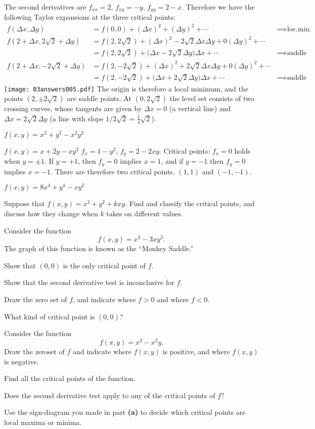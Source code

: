 \begin{multicols}{2}
The second derivatives are $f_{xx} = 2$, $f_{xy} = -y$, $f_{yy} =
2-x$.  Therefore we have the following Taylor expansions at the
three critical points:
\begin{align*}
    f(\Delta x, \Delta y) 
    &= f(0,0) + (\Delta x)^2 + (\Delta y)^2 + \cdots
    &\implies \text{loc.min.}\\
    f(2+\Delta x, 2\sqrt{2} + \Delta y) 
    &= f(2, 2\sqrt{2}) + (\Delta x)^2 - 2\sqrt{2} \Delta x \Delta y +
    0(\Delta y)^2+\cdots\\
    &= f(2, 2\sqrt{2}) + \bigl(\Delta x - 2\sqrt{2} \Delta y\bigr)
    \Delta x +\cdots
    &\implies \text{saddle}\\
    f(2+\Delta x, -2\sqrt{2} + \Delta y) 
    &= f(2, -2\sqrt{2}) + (\Delta x)^2 + 2\sqrt{2} \Delta x \Delta y +
    0(\Delta y)^2+\cdots\\
    &= f(2, -2\sqrt{2}) + \bigl(\Delta x + 2\sqrt{2} \Delta y\bigr)
    \Delta x +\cdots
    &\implies \text{saddle}
\end{align*}
\texttt{[image: 03answers005.pdf]}
The origin is therefore a local minimum, and the points $(2,
\pm2\sqrt{2})$ are saddle points.  At $(0, 2\sqrt{2})$ the level set
consists of two crossing curves, whose tangents are given by
$\Delta x=0$ (a vertical line) and $\Delta x=2\sqrt{2}\Delta y$ (a line
with slope $1/2\sqrt{2} = \frac14\sqrt{2}$).
\endanswer

\subprob $f(x, y) = x^2 + y^2 - x^2y^2$ 

\subprob $f(x,y) = x+2y - xy^2$ 
\answer 
$f_x = 1-y^2$, $f_y = 2-2xy$.  
Critical points: $f_x=0$ holds when $y=\pm 1$.  If $y=+1$, then
$f_y=0$ implies $x=1$, and if $y=-1$ then $f_y=0$ implies $x=-1$.
There are therefore two critical points, $(1,1)$ and $(-1,-1)$.
\endanswer

\subprob $f(x, y) = 8x^4 + y^4 - xy^2$ 

\problem Suppose that $f(x,y)=x^2+y^2+kxy$. Find and classify the critical  
points, and discuss how they change when $k$ takes on different values.

\problem Consider the function
\[
f(x,y)=x^3-3xy^2.
\]
The graph of this function is known as the ``Monkey Saddle.''

\subprob Show that $(0,0)$ is the only critical point of $f$. 

\subprob Show that the second derivative test is inconclusive for $f$. 

\subprob Draw the zero set of $f$, and indicate where $f>0$ and where $f<0$. 

\subprob What kind of critical point is $(0,0)$? 

\problem Consider the function
\[
f(x,y)=x^3 - x^2y.
\]
\subprob Draw the zeroset of $f$ and indicate where $f(x,y)$ is positive, and where
$f(x,y)$ is negative.

\subprob Find all the critical points of the function.  

\subprob Does the second derivative test apply to any of the critical points of
$f$?

\subprob Use the sign-diagram you made in part \textbf{(a)} to decide which critical
points are local maxima or minima.
\noproblemfont
\end{multicols}

